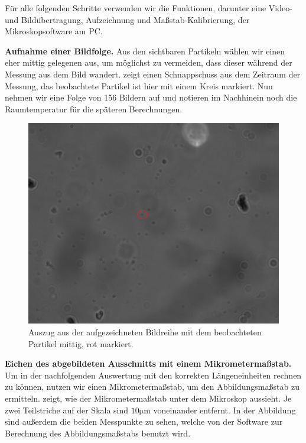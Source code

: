 Für alle folgenden Schritte verwenden wir die Funktionen, darunter eine Video- und Bildübertragung, Aufzeichnung und Maßstab-Kalibrierung, der Mikroskopsoftware am PC.

\textbf{Aufnahme einer Bildfolge.} Aus den sichtbaren Partikeln wählen wir einen eher mittig gelegenen aus, um möglichst zu vermeiden, dass dieser während der Messung aus dem Bild wandert.  zeigt einen Schnappschuss aus dem Zeitraum der Messung, das beobachtete Partikel ist hier mit einem Kreis markiert. Nun nehmen wir eine Folge von 156 Bildern auf und notieren im Nachhinein noch die Raumtemperatur für die späteren Berechnungen.

\begin{figure}[H]
  \centering
  \includegraphics[width=.66\textwidth]{files/Bild105.png}
  \caption{Auszug aus der aufgezeichneten Bildreihe mit dem beobachteten Partikel mittig, rot markiert.}
  \label{fig:bild105}
\end{figure}
\textbf{Eichen des abgebildeten Ausschnitts mit einem Mikrometermaßstab.} Um in der nachfolgenden Auswertung mit den korrekten Längeneinheiten rechnen zu können, nutzen wir einen Mikrometermaßstab, um den Abbildungsmaßstab zu ermitteln.  zeigt, wie der Mikrometermaßstab unter dem Mikroskop aussieht. Je zwei Teilstriche auf der Skala sind $10\si{\micro\meter}$ voneinander entfernt. In der Abbildung sind außerdem die beiden Messpunkte zu sehen, welche von der Software zur Berechnung des Abbildungsmaßstabs benutzt wird.

